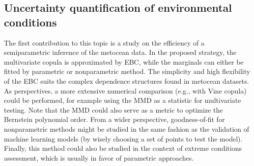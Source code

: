 \subsection*{Uncertainty quantification of environmental conditions}
The first contribution to this topic is a study on the efficiency of a semiparametric inference of the metocean data. 
In the proposed strategy, the multivariate copula is approximated by EBC, while the marginals can either be fitted by parametric or nonparametric method.   
The simplicity and high flexibility of the EBC suits the complex dependence structures found in metocean datasets. 
As perspectives, a more extensive numerical comparison (e.g., with Vine copula) could be performed, for example using the MMD as a statistic for multivariate testing. 
Note that the MMD could also serve as a metric to optimize the Bernstein polynomial order. 
From a wider perspective, goodness-of-fit for nonparametric methods might be studied in the same fashion as the validation of machine learning models (by wisely choosing a set of points to test the model).
Finally, this method could also be studied in the context of extreme conditions assessment, which is usually in favor of parametric approaches. 

